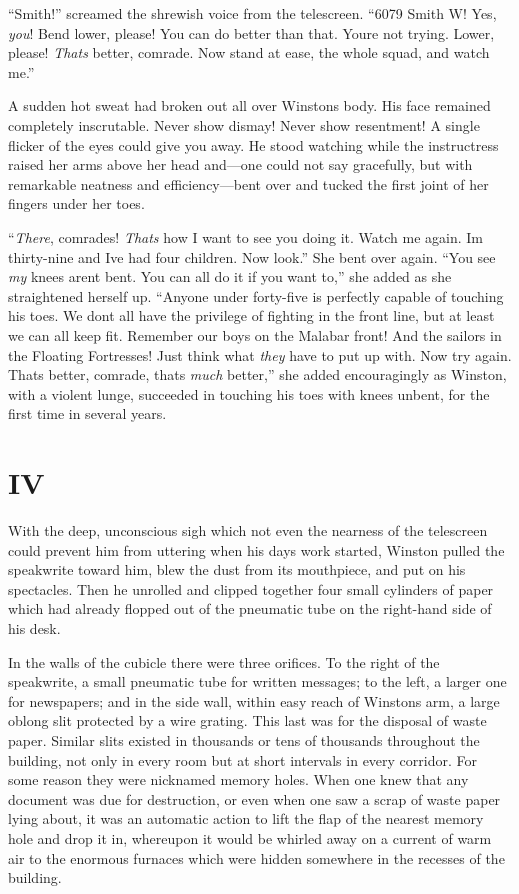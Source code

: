 ``Smith!'' screamed the shrewish voice from the telescreen. ``6079 Smith W!
Yes, \emph{you}! Bend lower, please! You can do better than that.
You\textquotesingle re not trying. Lower, please!
\emph{That\textquotesingle s} better, comrade. Now stand at ease, the
whole squad, and watch me.''

A sudden hot sweat had broken out all over Winston\textquotesingle s
body. His face remained completely inscrutable. Never show dismay! Never
show resentment! A single flicker of the eyes could give you away. He
stood watching while the instructress raised her arms above her head
and---one could not say gracefully, but with remarkable neatness and
efficiency---bent over and tucked the first joint of her fingers under
her toes.

``\emph{There}, comrades! \emph{That\textquotesingle s} how I want to see
you doing it. Watch me again. I\textquotesingle m thirty-nine and
I\textquotesingle ve had four children. Now look.'' She bent over again.
``You see \emph{my} knees aren\textquotesingle t bent. You can all do it
if you want to,'' she added as she straightened herself up. ``Anyone under
forty-five is perfectly capable of touching his toes. We
don\textquotesingle t all have the privilege of fighting in the front
line, but at least we can all keep fit. Remember our boys on the Malabar
front! And the sailors in the Floating Fortresses! Just think what
\emph{they} have to put up with. Now try again. That\textquotesingle s
better, comrade, that\textquotesingle s \emph{much} better,'' she added
encouragingly as Winston, with a violent lunge, succeeded in touching
his toes with knees unbent, for the first time in several years.


\section{IV}\label{iv}

With the deep, unconscious sigh which not even the nearness of the
telescreen could prevent him from uttering when his
day\textquotesingle s work started, Winston pulled the speakwrite toward
him, blew the dust from its mouthpiece, and put on his spectacles. Then
he unrolled and clipped together four small cylinders of paper which had
already flopped out of the pneumatic tube on the right-hand side of his
desk.

In the walls of the cubicle there were three orifices. To the right of
the speakwrite, a small pneumatic tube for written messages; to the
left, a larger one for newspapers; and in the side wall, within easy
reach of Winston\textquotesingle s arm, a large oblong slit protected by
a wire grating. This last was for the disposal of waste paper. Similar
slits existed in thousands or tens of thousands throughout the building,
not only in every room but at short intervals in every corridor. For
some reason they were nicknamed memory holes. When one knew that any
document was due for destruction, or even when one saw a scrap of waste
paper lying about, it was an automatic action to lift the flap of the
nearest memory hole and drop it in, whereupon it would be whirled away
on a current of warm air to the enormous furnaces which were hidden
somewhere in the recesses of the building.

